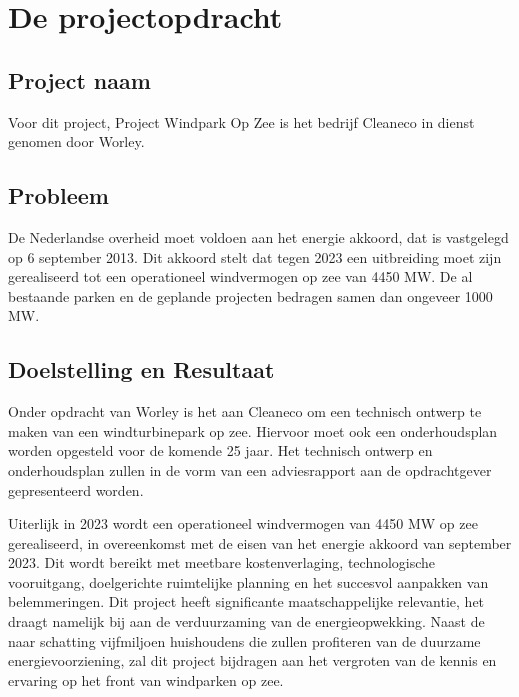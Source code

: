 \section{De projectopdracht}
\subsection{Project naam}
Voor dit project, Project Windpark Op Zee is het bedrijf Cleaneco in dienst genomen door Worley. 

\subsection{Probleem}
De Nederlandse overheid moet voldoen aan het \gls{energie akkoord}, dat is vastgelegd op 6 september 2013. Dit akkoord stelt dat tegen 2023 een uitbreiding moet zijn gerealiseerd tot een operationeel windvermogen op zee van 4450 MW. De al bestaande parken en de geplande projecten bedragen samen dan ongeveer 1000 MW.


\subsection{Doelstelling en Resultaat}
Onder opdracht van Worley is het aan Cleaneco om een technisch ontwerp te maken van een windturbinepark op zee. Hiervoor moet ook een onderhoudsplan worden opgesteld voor de komende 25 jaar. Het technisch ontwerp en onderhoudsplan zullen in de vorm van een adviesrapport aan de opdrachtgever gepresenteerd worden.

Uiterlijk in 2023 wordt een operationeel windvermogen van 4450 MW op zee gerealiseerd, in overeenkomst met de eisen van het \gls{energie akkoord} van september 2023. Dit wordt bereikt met meetbare kostenverlaging, technologische vooruitgang, doelgerichte ruimtelijke planning en het succesvol aanpakken van belemmeringen. Dit project heeft significante maatschappelijke relevantie, het draagt namelijk bij aan de verduurzaming van de energieopwekking. Naast de naar schatting vijfmiljoen huishoudens die zullen profiteren van de duurzame energievoorziening, zal dit project bijdragen aan het vergroten van de kennis en ervaring op het front van windparken op zee.  

